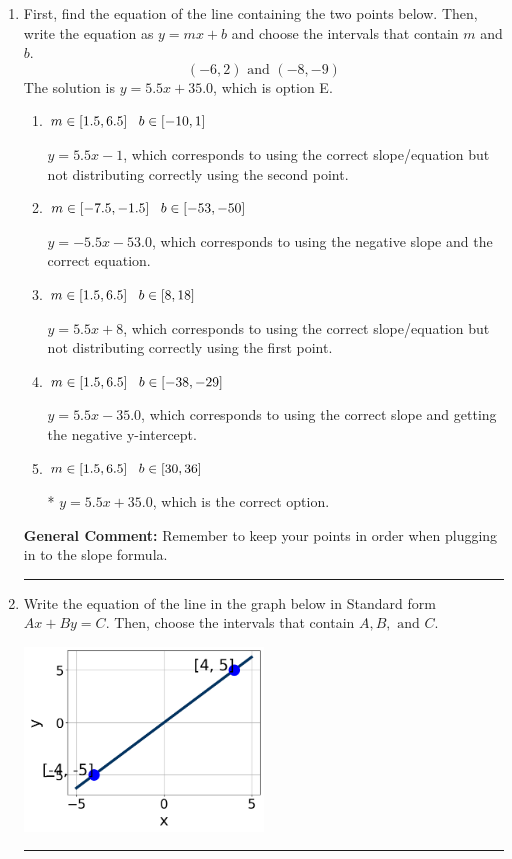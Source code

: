 \documentclass{extbook}[14pt]
\newcommand{\litem}[1]{\item #1

\rule{\textwidth}{0.4pt}}
\begin{document}
\begin{enumerate}\litem{
First, find the equation of the line containing the two points below. Then, write the equation as $ y=mx+b $ and choose the intervals that contain $m$ and $b$.
\[ (-6, 2) \text{ and } (-8, -9) \]The solution is \( y = 5.5x + 35.0 \), which is option E.\begin{enumerate}[label=\Alph*.]
\item \( m \in [1.5, 6.5] \hspace*{3mm} b \in [-10, 1] \)

 $y = 5.5x -1$, which corresponds to using the correct slope/equation but not distributing correctly using the second point.
\item \( m \in [-7.5, -1.5] \hspace*{3mm} b \in [-53, -50] \)

 $y = -5.5x -53.0$, which corresponds to using the negative slope and the correct equation.
\item \( m \in [1.5, 6.5] \hspace*{3mm} b \in [8, 18] \)

 $y = 5.5x + 8$, which corresponds to using the correct slope/equation but not distributing correctly using the first point.
\item \( m \in [1.5, 6.5] \hspace*{3mm} b \in [-38, -29] \)

 $y = 5.5x -35.0$, which corresponds to using the correct slope and getting the negative y-intercept.
\item \( m \in [1.5, 6.5] \hspace*{3mm} b \in [30, 36] \)

* $y = 5.5x + 35.0$, which is the correct option.
\end{enumerate}

\textbf{General Comment:} Remember to keep your points in order when plugging in to the slope formula.
}
\litem{
Write the equation of the line in the graph below in Standard form $Ax+By=C$. Then, choose the intervals that contain $A, B, \text{ and } C$.

\begin{center}
    \includegraphics[width=0.5\textwidth]{../Figures/linearGraphToStandardC.png}
\end{center}


}
\end{enumerate}
\end{document}
